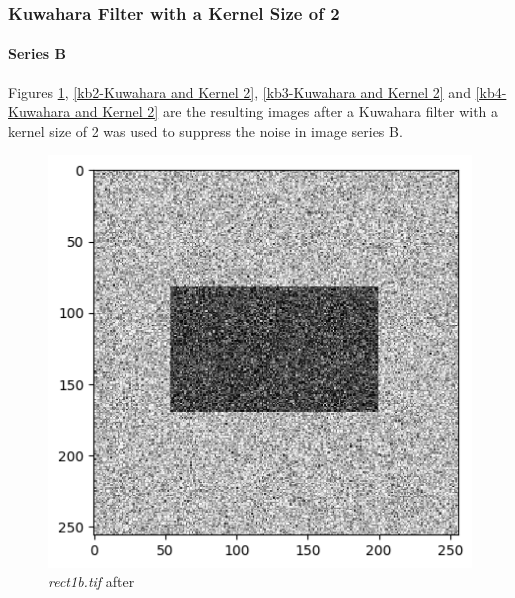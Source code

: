 \documentclass[runningheads]{llncs}
\begin{document}
\subsubsection*{Kuwahara Filter with a Kernel Size of 2}
\paragraph*{\textbf{Series B}}
Figures \ref{kb1-Kuwahara and Kernel 2}, \ref{kb2-Kuwahara and Kernel 2}, \ref{kb3-Kuwahara and Kernel 2} and \ref{kb4-Kuwahara and Kernel 2} are the resulting images after a Kuwahara filter with a kernel size of 2 was used to suppress the noise in image series B. 
\begin{figure}[h!]
\begin{minipage}[h]{0.47\linewidth}
\begin{center}
\includegraphics[width=1\linewidth]{Report/Result_Images/image_kb1.png} 
\caption{\emph{rect1b.tif} after}
\label{kb1-Kuwahara and Kernel 2}
\end{center} 
\end{minipage}
\hfill
\vspace{0.2 cm}
\begin{minipage}[h]{0.47\linewidth}
\begin{center}

\end{center}
\end{minipage}
\end{figure}
\end{document}
